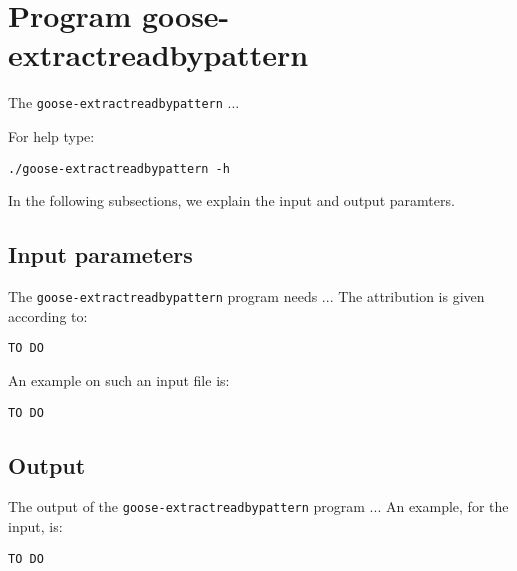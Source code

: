 \section{Program goose-extractreadbypattern}
The \texttt{goose-extractreadbypattern} ...

For help type:
\begin{lstlisting}
./goose-extractreadbypattern -h
\end{lstlisting}
In the following subsections, we explain the input and output paramters.

\subsection{Input parameters}

The \texttt{goose-extractreadbypattern} program needs ...
The attribution is given according to:
\begin{lstlisting}
TO DO
\end{lstlisting}

An example on such an input file is:
\begin{lstlisting}
TO DO
\end{lstlisting}

\subsection{Output}
The output of the \texttt{goose-extractreadbypattern} program ...
An example, for the input, is:
\begin{lstlisting}
TO DO
\end{lstlisting}
